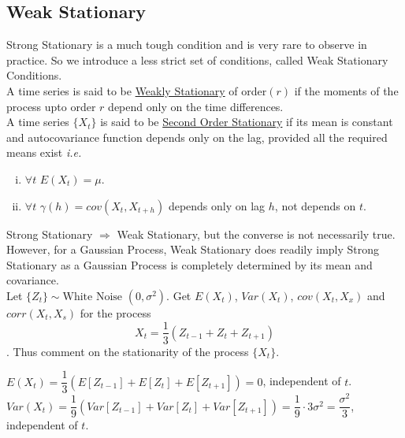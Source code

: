 \documentclass[11pt, a4paper]{article}
\begin{document}
\subsection{Weak Stationary}

Strong Stationary is a much tough condition and is very rare to observe in practice. So we introduce a less strict set of conditions, called Weak Stationary Conditions. \\

A time series is said to be \underline{Weakly Stationary} of order$(r)$ if the moments of the process upto order $r$ depend only on the time differences. \\

A time series $\{X_t\}$ is said to be \underline{Second Order Stationary} if its mean is constant and autocovariance function depends only on the lag, provided all the required means exist \textit{i.e.}

\begin{enumerate}[(i)]
\item $\forall t$ $E(X_t) = \mu$.
\item $\forall t$ $\gamma(h) = cov(X_t, X_{t+h})$ depends only on lag $h$, not depends on $t$.
\end{enumerate}

\bcattention \hspace{0.1cm} Strong Stationary $\Rightarrow$ Weak Stationary, but the converse is not necessarily true. However, for a Gaussian Process, Weak Stationary does readily imply Strong Stationary as a Gaussian Process is completely determined by its mean and covariance. \\

\bclampe \hspace{0.1cm} Let $\{Z_t\} \sim \text{White Noise }(0, \sigma^2)$. Get $E(X_t)$, $Var(X_t)$, $cov(X_t, X_x)$ and $corr(X_t, X_s)$ for the process $$X_t = \dfrac{1}{3}(Z_{t-1} + Z_t + Z_{t+1})$$. Thus comment on the stationarity of the process $\{X_t\}$.

\bcplume \hspace{0.1cm} $E(X_t) = \dfrac{1}{3}(E[Z_{t-1}] + E[Z_t] + E[Z_{t+1}]) = 0$, independent of $t$. \\

$Var(X_t) = \dfrac{1}{9}(Var[Z_{t-1}] + Var[Z_t] + Var[Z_{t+1}]) = \dfrac{1}{9} \cdot 3\sigma^2 = \dfrac{\sigma^2}{3}$, independent of $t$. \\
\end{document}
